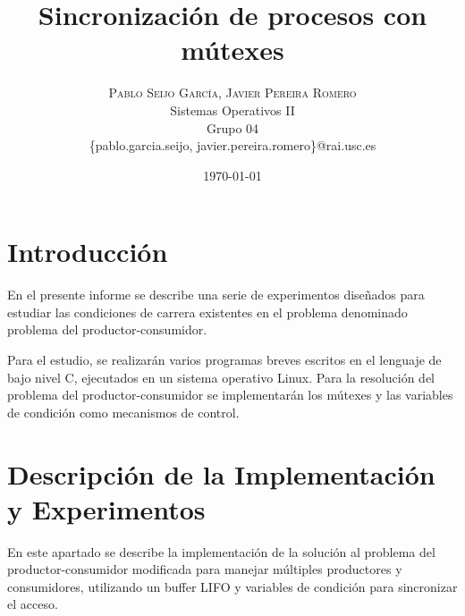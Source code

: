 \documentclass[a4paper,twocolumn]{article}
\title{Sincronización de procesos con mútexes} %
\author{%
	\textsc{Pablo Seijo García, Javier Pereira Romero} \\[1ex] %
	\normalsize Sistemas Operativos II\\
	\normalsize Grupo 04 \\ %
	\normalsize \{pablo.garcia.seijo, javier.pereira.romero\}@rai.usc.es %
}
\date{\today} %
\begin{document}
	
	\maketitle
	
	
	\section{Introducción}

        En el presente informe se describe una serie de experimentos diseñados para estudiar las condiciones de carrera existentes en el problema denominado problema del productor-consumidor.
        
        Para el estudio, se realizarán varios programas breves escritos en el lenguaje de bajo nivel C, ejecutados en un sistema operativo Linux. Para la resolución del problema del productor-consumidor se implementarán los mútexes y las variables de condición como mecanismos de control.

 
	
	

	

\section{Descripción de la Implementación y Experimentos}

En este apartado se describe la implementación de la solución al problema del productor-consumidor modificada para manejar múltiples productores y consumidores, utilizando un buffer LIFO y variables de condición para sincronizar el acceso.
\end{document}
